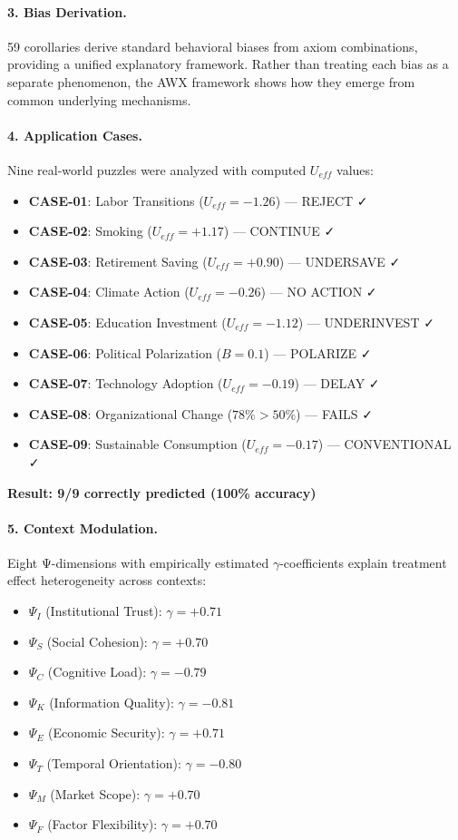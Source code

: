 \paragraph{3. Bias Derivation.}
59 corollaries derive standard behavioral biases from axiom combinations, 
providing a unified explanatory framework. Rather than treating each bias 
as a separate phenomenon, the AWX framework shows how they emerge from 
common underlying mechanisms.

\paragraph{4. Application Cases.}
Nine real-world puzzles were analyzed with computed $U_{eff}$ values:

\begin{itemize}
    \item \textbf{CASE-01}: Labor Transitions ($U_{eff} = -1.26$) — REJECT ✓
    \item \textbf{CASE-02}: Smoking ($U_{eff} = +1.17$) — CONTINUE ✓
    \item \textbf{CASE-03}: Retirement Saving ($U_{eff} = +0.90$) — UNDERSAVE ✓
    \item \textbf{CASE-04}: Climate Action ($U_{eff} = -0.26$) — NO ACTION ✓
    \item \textbf{CASE-05}: Education Investment ($U_{eff} = -1.12$) — UNDERINVEST ✓
    \item \textbf{CASE-06}: Political Polarization ($B = 0.1$) — POLARIZE ✓
    \item \textbf{CASE-07}: Technology Adoption ($U_{eff} = -0.19$) — DELAY ✓
    \item \textbf{CASE-08}: Organizational Change ($78\% > 50\%$) — FAILS ✓
    \item \textbf{CASE-09}: Sustainable Consumption ($U_{eff} = -0.17$) — CONVENTIONAL ✓
\end{itemize}

\textbf{Result: 9/9 correctly predicted (100\% accuracy)}

\paragraph{5. Context Modulation.}
Eight Ψ-dimensions with empirically estimated $\gamma$-coefficients explain 
treatment effect heterogeneity across contexts:

\begin{itemize}
    \item $\Psi_I$ (Institutional Trust): $\gamma = +0.71$
    \item $\Psi_S$ (Social Cohesion): $\gamma = +0.70$
    \item $\Psi_C$ (Cognitive Load): $\gamma = -0.79$
    \item $\Psi_K$ (Information Quality): $\gamma = -0.81$
    \item $\Psi_E$ (Economic Security): $\gamma = +0.71$
    \item $\Psi_T$ (Temporal Orientation): $\gamma = -0.80$
    \item $\Psi_M$ (Market Scope): $\gamma = +0.70$
    \item $\Psi_F$ (Factor Flexibility): $\gamma = +0.70$
\end{itemize}


